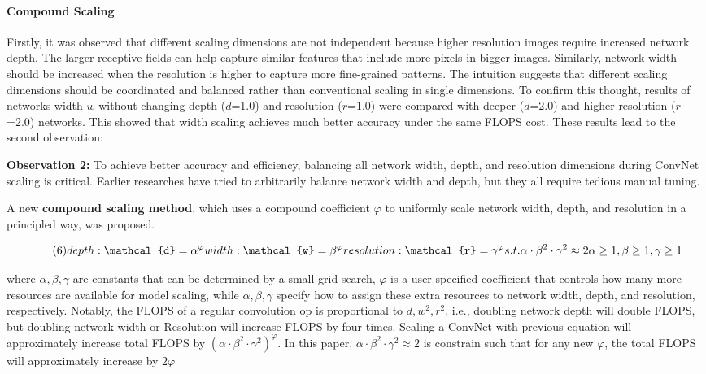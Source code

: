 \documentclass[
]{krantz}
\begin{document}
\hypertarget{compound-scaling}{%
\paragraph{Compound Scaling}\label{compound-scaling}}

Firstly, it was observed that different scaling dimensions are not independent because higher resolution images require increased network depth. The larger receptive fields can help capture similar features that include more pixels in bigger images. Similarly, network width should be increased when the resolution is higher to capture more fine-grained patterns. The intuition suggests that different scaling dimensions should be coordinated and balanced rather than conventional scaling in single dimensions.
To confirm this thought, results of networks width \(w\) without changing depth (\(d\)=1.0) and resolution (\(r\)=1.0) were compared with deeper (\(d\)=2.0) and higher resolution (\(r\)=2.0) networks. This showed that width scaling achieves much better accuracy under the same FLOPS cost. These results lead to the second observation:

\textbf{Observation 2:} To achieve better accuracy and efficiency, balancing all network width, depth, and resolution dimensions during ConvNet scaling is critical. Earlier researches have tried to arbitrarily balance network width and depth, but they all require tedious manual tuning.

A new \textbf{compound scaling method}, which uses a compound coefficient \(\varphi\) to uniformly scale network width, depth, and resolution in a principled way, was proposed.

\begin{equation}
\tag{6}
depth: \mathcal{d}=\alpha^{\varphi} \\
width: \mathcal{w}=\beta^{\varphi}\\
resolution: \mathcal{r}=\gamma^{\varphi}\\
s.t.  \alpha\cdot \beta^{2}\cdot \gamma^{2}\approx 2\\
 \alpha \ge 1, \beta \ge 1, \gamma \ge 1\\
\end{equation}

where \(\alpha, \beta, \gamma\) are constants that can be determined by a small grid search, \(\varphi\) is a user-specified coefficient that controls how many more resources are available for model scaling, while \(\alpha, \beta, \gamma\) specify how to assign these extra resources to network width, depth, and resolution, respectively. Notably, the FLOPS of a regular convolution op is proportional to \(d, w^{2}, r^{2}\), i.e., doubling network depth will double FLOPS, but doubling network width or Resolution will increase FLOPS by four times. Scaling a ConvNet with previous equation will approximately increase total FLOPS by \(\left( \alpha\cdot \beta^{2}\cdot \gamma^{2} \right)^{\varphi}\). In this paper, \(\alpha\cdot \beta^{2}\cdot \gamma^{2}\approx 2\) is constrain such that for any new \(\varphi\), the total FLOPS will approximately increase by \(2\varphi\)
\end{document}
